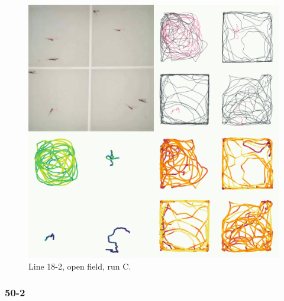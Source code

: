 \documentclass[
]{book}
\begin{document}
\begin{figure}
\includegraphics[width=1\linewidth]{figs/mikk_behaviour/four_panel_plots/open_field_20191119_1459_18-2_R_C_300} \caption{Line 18-2, open field, run C.}\label{fig:4p-18-2-of-C}
\end{figure}

\hypertarget{section-2}{%
\subsubsection{50-2}\label{section-2}}
\end{document}
